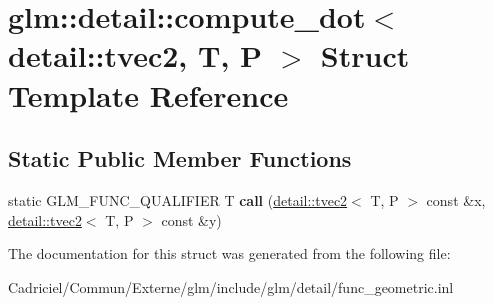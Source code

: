 \hypertarget{structglm_1_1detail_1_1compute__dot_3_01detail_1_1tvec2_00_01_t_00_01_p_01_4}{}\section{glm\+:\+:detail\+:\+:compute\+\_\+dot$<$ detail\+:\+:tvec2, T, P $>$ Struct Template Reference}
\label{structglm_1_1detail_1_1compute__dot_3_01detail_1_1tvec2_00_01_t_00_01_p_01_4}
\subsection*{Static Public Member Functions}
\begin{DoxyCompactItemize}
\item 
static G\+L\+M\+\_\+\+F\+U\+N\+C\+\_\+\+Q\+U\+A\+L\+I\+F\+I\+ER T {\bfseries call} (\hyperlink{structglm_1_1detail_1_1tvec2}{detail\+::tvec2}$<$ T, P $>$ const \&x, \hyperlink{structglm_1_1detail_1_1tvec2}{detail\+::tvec2}$<$ T, P $>$ const \&y)\hypertarget{structglm_1_1detail_1_1compute__dot_3_01detail_1_1tvec2_00_01_t_00_01_p_01_4_a5ab1761eaa0efc9ecb4f62171d2a6dd2}{}\label{structglm_1_1detail_1_1compute__dot_3_01detail_1_1tvec2_00_01_t_00_01_p_01_4_a5ab1761eaa0efc9ecb4f62171d2a6dd2}

\end{DoxyCompactItemize}


The documentation for this struct was generated from the following file\+:\begin{DoxyCompactItemize}
\item 
Cadriciel/\+Commun/\+Externe/glm/include/glm/detail/func\+\_\+geometric.\+inl\end{DoxyCompactItemize}

